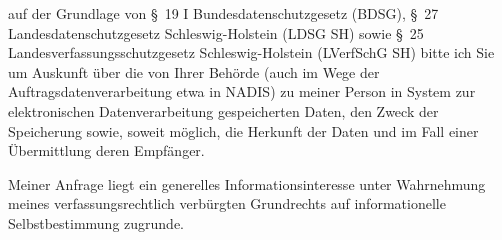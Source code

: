 auf der Grundlage von §~19 I Bundesdatenschutzgesetz (BDSG),
§~27 Landesdatenschutzgesetz Schleswig-Holstein (LDSG SH) sowie
§~25 Landesverfassungsschutzgesetz Schleswig-Holstein (LVerfSchG SH) bitte ich
Sie um Auskunft über die von Ihrer Behörde (auch im Wege der Auftragsdatenverarbeitung
etwa in NADIS) zu meiner Person in System zur elektronischen Datenverarbeitung
gespeicherten Daten, den Zweck der Speicherung sowie, soweit möglich, die Herkunft
der Daten und im Fall einer Übermittlung deren Empfänger.

Meiner Anfrage liegt ein generelles Informationsinteresse unter Wahrnehmung
meines verfassungsrechtlich verbürgten Grundrechts auf informationelle
Selbstbestimmung zugrunde.
